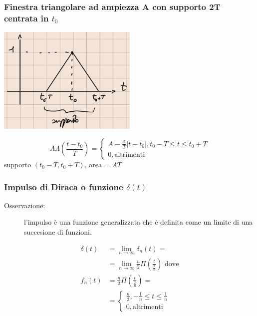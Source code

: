 \documentclass[a4paper, 12pt]{book}
\theoremstyle{plain}
\begin{document}
\subsubsection{Finestra triangolare ad ampiezza A con supporto 2T centrata in $t_0$}

\begin{center}
    \includegraphics[width=0.5\textwidth]{triangolo2.png}
\end{center}

\[
    A\Lambda(\frac{t - t_0}{T}) = \begin{cases}
        A - \frac{A}{T} |t - t_0|, t_0 - T \le t \le t_0 + T\\
        0, \textrm{altrimenti}
    \end{cases}
\]
supporto $(t_0 - T, t_0 + T)$, area = $AT$

\subsubsection{Impulso di Diraca o funzione $\delta (t)$}
\begin{description}
    \item[Osservazione: ] l'impulso è una funzione generalizzata che è definita come un limite di una succesione di funzioni. 
\end{description}

\[
    \begin{split}
        \delta(t) &= \lim_{n \rightarrow \infty} \delta_n (t) =\\
        &= \lim_{n \rightarrow \infty} \frac{n}{2}\Pi(\frac{t}{\frac{2}{n}}) \textrm{ dove}\\
        f_n(t) &= \frac{n}{2}\Pi(\frac{t}{\frac{2}{n}}) = \\
        &=\begin{cases}
            \frac{n}{2}, -\frac{1}{n} \le t \le \frac{1}{n}\\
            0, \textrm{altrimenti}
        \end{cases}
    \end{split}  
\]
\end{document}
